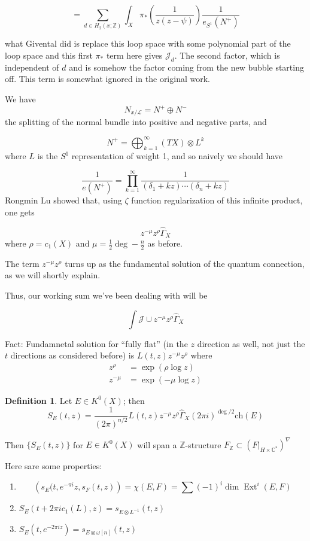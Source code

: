 \documentclass{amsart}
\theoremstyle{definition}
\newtheorem{definition}[dummy]{Definition}
\DeclareMathOperator{\Ext}{Ext}
\newcommand{\Z}{\mathbb{Z}}
\newcommand{\J}{\mathcal{J}}
\newcommand{\C}{\mathbb{C}}
\begin{document}
$$=\sum_{d\in H_2(x;\Z)}\int_X \pi_*\left(\frac{1}{z(z-\psi)}\right)\frac{1}{e_{S^1}(N^+)}$$

what Givental did is replace this loop space with some polynomial part of the loop space and this first $\pi_*$ term here gives $\J_d$.  The second factor, which is independent of $d$ and is somehow the factor coming from the new bubble starting off.  This term is somewhat ignored in the original work.

We have
$$N_{x/\mathcal{L}}=N^+\oplus N^-$$
the splitting of the normal bundle into positive and negative parts, and

$$N^+=\bigoplus_{k=1}^\infty (TX)\otimes L^k$$
where $L$ is the $S^1$ representation of weight 1, and so naively we should have

$$\frac{1}{e(N^+)}=\prod_{k=1}^\infty\frac{1}{(\delta_1+kz)\cdots(\delta_n+kz)}$$
Rongmin Lu showed that, using $\zeta$ function regularization of this infinite product, one gets

$$z^{-\mu}z^\rho \widehat{\Gamma}_X$$
where $\rho=c_1(X)$ and $\mu=\frac{1}{2}\deg-\frac{n}{2}$ as before.

The term $z^{-\mu}z^\rho$ turns up as the fundamental solution of the quantum connection, as we will shortly explain.

Thus, our working sum we've been dealing with will be

$$\int\J\cup z^{-\mu}z^\rho \widehat{\Gamma}_X$$

Fact: Fundamnetal solution for ``fully flat'' (in the $z$ direction as well, not just the $t$ directions as considered before) is $L(t,z)z^{-\mu}z^\rho$
where
\begin{align*}
z^\rho&=\exp(\rho\log z) \\
z^{-\mu}&=\exp(-\mu\log z)
\end{align*}
\begin{definition}
Let $E\in K^0(X)$; then
$$S_E(t,z)=\frac{1}{(2\pi)^{n/2}}L(t,z)z^{-\mu}z^\rho \widehat{\Gamma}_X (2\pi i)^{\deg /2} \text{ch}(E)$$

\end{definition}
Then $\{S_E(t,z)\}$ for $E\in K^0(X)$ will span a $\Z$-structure $F_\Z\subset\left( F|_{H\times\C^*}\right)^\nabla$


Here sare some properties:
\begin{enumerate}
\item $$\left( s_E(t, e^{-\pi i}z, s_F(t,z)\right)=\chi(E,F)=\sum (-1)^i\dim \Ext^i(E,F)$$
\item $S_E(t+2\pi ic_1(L),z)=s_{E\otimes L^{-1}}(t,z)$
\item $S_E(t, e^{-2\pi iz})=s_{E\otimes\omega[n]}(t,z)$
\end{enumerate}
\end{document}
